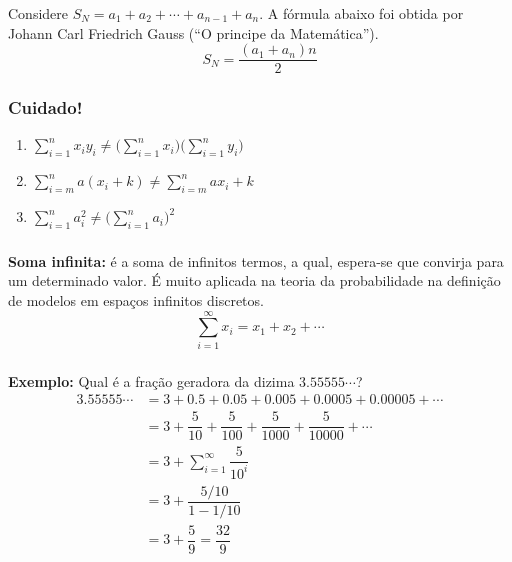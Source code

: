\documentclass[12pt]{beamer}
\begin{document}
\begin{frame}{}
\begin{block}{}
\begin{minipage}{0.6\textwidth}
Considere $S_{N}=a_{1}+a_{2}+\cdots + a_{n-1}+a_{n}.$ A fórmula abaixo foi obtida por Johann Carl Friedrich Gauss (``O principe da Matemática''). 
$$S_{N}=\dfrac{(a_{1}+a_{n})n}{2}$$
\end{minipage}
\end{block}
\end{frame}

\begin{frame}{}
\frametitle{Cuidado!}
\begin{block}{}
\justifying
\begin{enumerate}
\item ${\displaystyle \sum_{i=1}^{n}x_{i}y_{i}\neq\Big(\sum_{i=1}^{n}x_{i}\Big)\Big(\sum_{i=1}^{n}y_{i}\Big)}$\pause
\item ${\displaystyle \sum_{i=m}^{n}a(x_{i}+k)\neq\sum_{i=m}^{n}ax_{i}+k}$\pause
\item ${\displaystyle \sum_{i=1}^{n}a_{i}^{2}\neq \Biggl(\sum_{i=1}^{n}a_{i}\Biggl)^{2}}$ 
\end{enumerate}
\end{block}
\end{frame}

\begin{frame}{}
\frametitle{}
\begin{block}{}
\justifying
{\bf Soma infinita:} é a soma de infinitos termos, a qual, espera-se que convirja para um determinado
valor. É muito aplicada na teoria da probabilidade na definição de modelos em espaços infinitos discretos.
$${\displaystyle \sum_{i=1}^{\infty}x_{i}=x_{1}+x_{2}+\cdots}$$
\end{block}
\end{frame}

\begin{frame}{}
\frametitle{}
\begin{block}{}
\justifying
{\bf Exemplo:} Qual é a fração geradora da dizima $3.55555\cdots$?
\begin{align*}
3.55555\cdots &=3+0.5+0.05+0.005+0.0005+0.00005+\cdots\\
&=3+\dfrac{5}{10}+\dfrac{5}{100}+\dfrac{5}{1000}+\dfrac{5}{10000}+\cdots\\
&=3+{\displaystyle \sum_{i=1}^{\infty}\dfrac{5}{10^{i}}}\\
&=3+\dfrac{5/10}{1-1/10}\\
&=3+\dfrac{5}{9}=\dfrac{32}{9}
\end{align*}
\end{block}
\end{frame}
\end{document}
